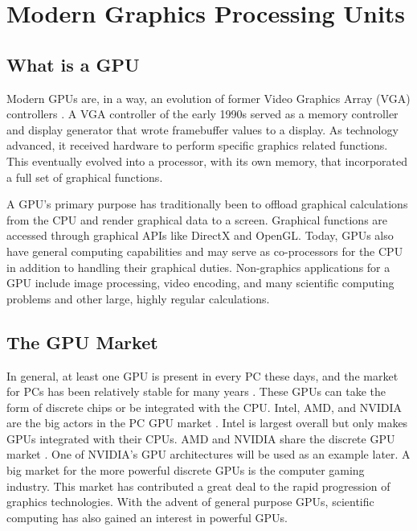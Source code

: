 \documentclass[../main/report.tex]{subfiles}
\begin{document}
\chapter{Modern Graphics Processing Units}
\label{sec:modern_gpu}

\section{What is a GPU}

Modern GPUs are, in a way, an evolution of former Video Graphics Array (VGA) controllers \cite{gpu_appendix}.
A VGA controller of the early 1990s served as a memory controller and display generator that wrote framebuffer values to a display.
As technology advanced, it received hardware to perform specific graphics related functions.
This eventually evolved into a processor, with its own memory, that incorporated a full set of graphical functions.

A GPU's primary purpose has traditionally been to offload graphical calculations from the CPU and render graphical data to a screen.
Graphical functions are accessed through graphical APIs like DirectX and OpenGL.
Today, GPUs also have general computing capabilities and may serve as co-processors for the CPU in addition to handling their graphical duties.
Non-graphics applications for a GPU include image processing, video encoding, and many scientific computing problems and other large, highly regular calculations.


\section{The GPU Market}




In general, at least one GPU is present in every PC these days, and the market for PCs has been relatively stable for many years \cite{pc_sales}.
These GPUs can take the form of discrete chips or be integrated with the CPU.
Intel, AMD, and NVIDIA are the big actors in the PC GPU market \cite{gpu_overall_sales}.
Intel is largest overall but only makes GPUs integrated with their CPUs.
AMD and NVIDIA share the discrete GPU market \cite{gpu_discrete_sales}.
One of NVIDIA's GPU architectures will be used as an example later.
A big market for the more powerful discrete GPUs is the computer gaming industry.
This market has contributed a great deal to the rapid progression of graphics technologies.
With the advent of general purpose GPUs, scientific computing has also gained an interest in powerful GPUs.
\end{document}
